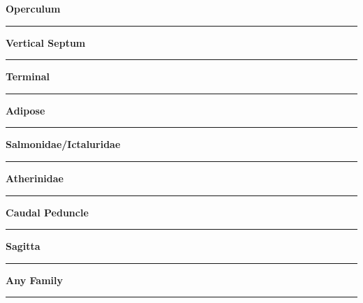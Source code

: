 \documentclass[11pt]{exam}
\newcommand*\Matching[1]{
\ifprintanswers
	\textbf{#1}
\else
	\rule{2.1in}{0.4pt}
\fi
}
\newlength\matchlena
\newlength\matchlenb
\newcommand\MatchQuestion[2]{%
	\setlength\matchlenb{\linewidth}
	\addtolength\matchlenb{-\matchlena}
	\parbox[t]{\matchlena}{\Matching{#1}}\enspace\parbox[t]{\matchlenb}{#2}}
\begin{document}
\begin{questions}
\begin{multicols}{2}
%
\question\MatchQuestion{Operculum}{}
\vspace{2\baselineskip}

\question\MatchQuestion{Vertical Septum}{}
\vspace{2\baselineskip}

\question\MatchQuestion{Terminal}{}
\vspace{2\baselineskip}

\question\MatchQuestion{Adipose}{}
\vspace{2\baselineskip}

\question[\textsc{ec}]\MatchQuestion{Salmonidae/Ictaluridae}{}
\vspace{2\baselineskip}

\question\MatchQuestion{Atherinidae}{}
\vspace{2\baselineskip}

\question\MatchQuestion{Caudal Peduncle}{}
\vspace{2\baselineskip}

\question[\textsc{ec}]\MatchQuestion{Sagitta}{}
\vspace{2\baselineskip}

\question[\textsc{ec}]\MatchQuestion{Any Family}{}
\vspace{2\baselineskip}

\end{multicols}

\end{questions}
\end{document}

